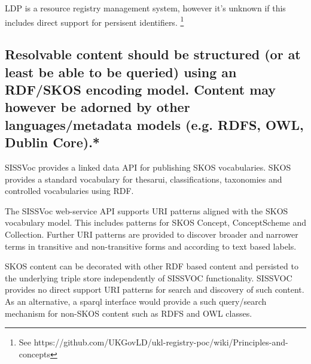 \documentclass[10pt,a4paper]{article}
\begin{document}
\begin{flushleft}
  \item[]LDP is a resource registry management system, however it's unknown 
  if this includes direct support for persisent identifiers.
    \footnote{ See 
    https://github.com/UKGovLD/ukl-registry-poc/wiki/Principles-and-concepts
  }


% 


% 
%   
% 
% 
% 


\subsection{Resolvable content should be structured (or at least be able to be queried)
  using an RDF/SKOS encoding model. Content may however be adorned by other
  languages/metadata models (e.g. RDFS, OWL, Dublin Core).* }

  SISSVoc provides a linked data API for publishing SKOS vocabularies.  SKOS
provides a standard vocabulary for thesarui, classifications, taxonomies and
controlled vocabularies using RDF.

  The SISSVoc web-service API supports URI patterns aligned with the SKOS
vocabulary model. This includes patterns for SKOS Concept,
ConceptScheme and Collection. Further URI patterns are provided to discover
broader and narrower terms in transitive and non-transitive forms and according
to text based labels. 

  SKOS content can be decorated with other RDF based
content and persisted to the underlying triple store independently of SISSVOC
functionality. SISSVOC provides
no direct support URI patterns for search and discovery of such content. As an
alternative, a sparql interface would provide a
such query/search mechanism for non-SKOS content such as RDFS and OWL classes. 


\end{flushleft}
\end{document}
